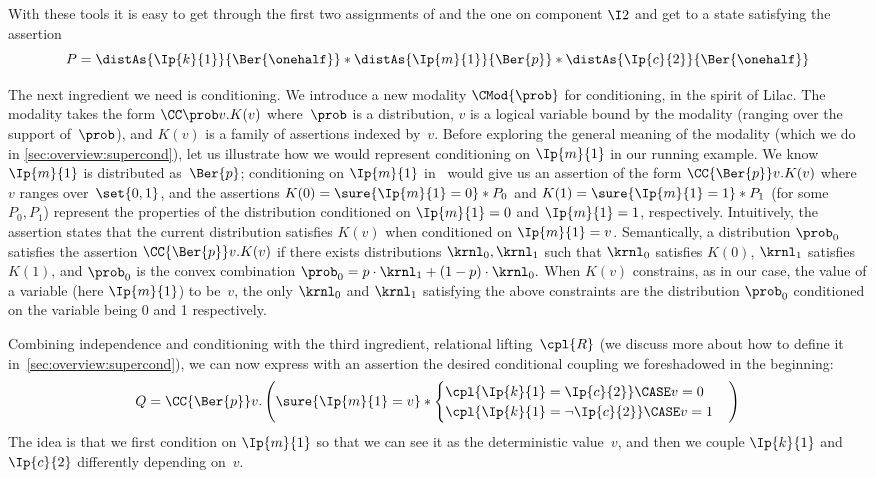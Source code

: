 With these tools it is easy to get through the first two assignments
of  and the one on component $\I2$ and get to a state
satisfying the assertion
\begin{equation}
  P =
  \distAs{\Ip{k}{1}}{\Ber{\onehalf}}
  *
  \distAs{\Ip{m}{1}}{\Ber{p}}
  *
  \distAs{\Ip{c}{2}}{\Ber{\onehalf}}
  \label{ex:xor:start}
\end{equation}

The next ingredient we need is conditioning.
We introduce a new modality $\CMod{\prob}$ for conditioning,
in the spirit of Lilac.
The modality takes the form
$
  \CC\prob v.K(v)
$
where~$\prob$ is a distribution, $v$ is a logical variable bound
by the modality (ranging over the support of~$\prob$),
and $K(v)$ is a family of assertions indexed by~$v$.
Before exploring the general meaning of the modality
(which we do in \cref{sec:overview:supercond}),
let us illustrate how we would represent conditioning on $\Ip{m}{1}$
in our running example.
We know $\Ip{m}{1}$ is distributed as~$\Ber{p}$;
conditioning on $\Ip{m}{1}$ in \thelogic\ would give us
an assertion of the form
$\CC{\Ber{p}} v. K(v)$
where~$v$ ranges over~$\set{0,1}$,
and the assertions
$K(0) = \sure{\Ip{m}{1}=0} * P_0 $
and
$K(1) = \sure{\Ip{m}{1}=1} * P_1 $
(for some $P_0,P_1$)
represent the properties of the distribution conditioned on
$ \Ip{m}{1}=0 $ and $ \Ip{m}{1}=1 $, respectively.
Intuitively, the assertion states that the current distribution
satisfies $K(v)$ when conditioned on $\Ip{m}{1}=v$.
Semantically, a distribution $\prob_0$ satisfies the assertion
$\CC{\Ber{p}} v. K(v)$
if there exists distributions $ \krnl_0, \krnl_1$ such that
$\krnl_0$ satisfies $ K(0)$,
$\krnl_1$ satisfies $ K(1)$, and
$\prob_0$ is the convex combination
$
  \prob_0 = p \cdot \krnl_1 + (1-p) \cdot \krnl_0.
$
When $K(v)$ constrains, as in our case, the value of a variable
(here $\Ip{m}{1}$) to be~$v$,
the only $\krnl_0$ and $\krnl_1$ satisfying the above constraints
are the distribution $\prob_0$ conditioned on the variable being 0 and 1 respectively.



Combining independence and conditioning with the third ingredient,
relational lifting~$\cpl{R}$ (we discuss more about how to define it
in~\cref{sec:overview:supercond}), we can now express with an assertion the desired
conditional coupling we foreshadowed in the beginning:
\begin{equation}
  Q =
  \CC{\Ber{p}} v.
    \left(
      \sure{\Ip{m}{1}=v}
      *
      \begin{cases}
        \cpl{ \Ip{k}{1} = \Ip{c}{2} }     \CASE v=0 \\
        \cpl{ \Ip{k}{1} = \neg\Ip{c}{2} } \CASE v=1
      \end{cases}
    \right)
  \label{ex:xor:ccouple}
\end{equation}
The idea is that we first condition on $\Ip{m}{1}$
so that we can see it as the deterministic value~$v$,
and then we couple $\Ip{k}{1}$ and $\Ip{c}{2}$ differently
depending on~$v$.

